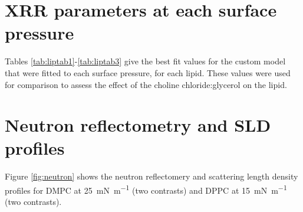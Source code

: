 \documentclass[11pt,a4paper]{paper}
\begin{document}
\section{XRR parameters at each surface pressure}
Tables \ref{tab:liptab1}-\ref{tab:liptab3} give the best fit values for the custom model that were fitted to each surface pressure, for each lipid. These values were used for comparison to assess the effect of the choline chloride:glycerol on the lipid.

\section{Neutron reflectometry and SLD profiles}
Figure \ref{fig:neutron} shows the neutron reflectomery and scattering length density profiles for DMPC at \SI{25}{\milli\newton\per\meter} (two contrasts) and DPPC at \SI{15}{\milli\newton\per\meter} (two contrasts).
\end{document}
